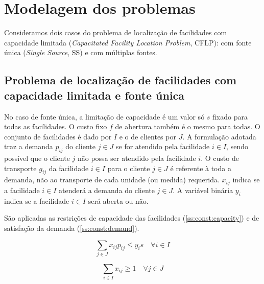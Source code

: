 \documentclass[]{article}
\title{}
\begin{document}
\maketitle

\begin{abstract}

\end{abstract}

\section{Modelagem dos problemas}

	Consideramos dois casos do problema de localização de facilidades com capacidade limitada 
	(\textit{Capacitated Facility Location Problem}, CFLP):
	com fonte única (\textit{Single Source}, SS) 
	e com múltiplas fontes. 
	
	\subsection{Problema de localização de facilidades com capacidade limitada e fonte única}
	
	No caso de fonte única, a limitação de capacidade é um valor só $s$ fixado para todas as facilidades.
	O custo fixo $f$ de abertura também é o mesmo para todas.
	O conjunto de facilidades é dado por $I$ e o de clientes por $J$.
	A formulação adotada traz a demanda $p_{ij}$ do cliente $j \in J$ se for atendido pela facilidade $i \in I$, 
	sendo possível que o cliente $j$ não possa ser atendido pela facilidade $i$.
	O custo de transporte $g_{ij}$ da facilidade $i \in I$ para o cliente $j \in J$ é referente à toda a demanda, não ao transporte de cada unidade (ou medida) requerida.
	$x_{ij}$ indica se a facilidade $i \in I$ atenderá a demanda do cliente $j \in J$.
	A variável binária $y_i$ indica se a facilidade $i \in I$ será aberta ou não.
	
	São aplicadas as restrições de capacidade das facilidades (\ref{ss:const:capacity}) e de satisfação da demanda (\ref{ss:const:demand}).
	
	\begin{equation}
		\label{ss:const:capacity}		
		\sum_{j \in J} x_{ij} p_{ij} \le y_i s 
		\quad
		\forall i \in I
	\end{equation}	

	\begin{equation}
		\label{ss:const:demand}		
		\sum_{i \in I} x_{ij} \ge 1 
		\quad
		\forall j \in J
	\end{equation}
\end{document}
